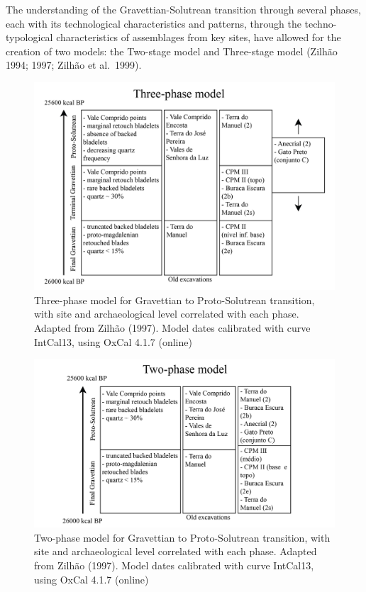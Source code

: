 \documentclass[12pt,twoside]{reedthesis}
\begin{document}
The understanding of the Gravettian-Solutrean transition through several phases, each with its technological characteristics and patterns, through the techno-typological characteristics of assemblages from key sites, have allowed for the creation of two models: the Two-stage model and Three-stage model (Zilhão 1994; 1997; Zilhão et al.~1999).
\begin{figure}
\includegraphics[width=1\linewidth]{figure/Three-phasemodel} \caption{Three-phase model for Gravettian to Proto-Solutrean transition, with site and archaeological level correlated with each phase. Adapted from Zilhão (1997). Model dates calibrated with curve IntCal13, using OxCal 4.1.7 (online)}\label{fig:unnamed-chunk-2}
\end{figure}
\begin{figure}
\includegraphics[width=1\linewidth]{figure/Two-phasemodel} \caption{Two-phase model for Gravettian to Proto-Solutrean transition, with site and archaeological level correlated with each phase. Adapted from Zilhão (1997). Model dates calibrated with curve IntCal13, using OxCal 4.1.7 (online)}\label{fig:unnamed-chunk-3}
\end{figure}
\end{document}
